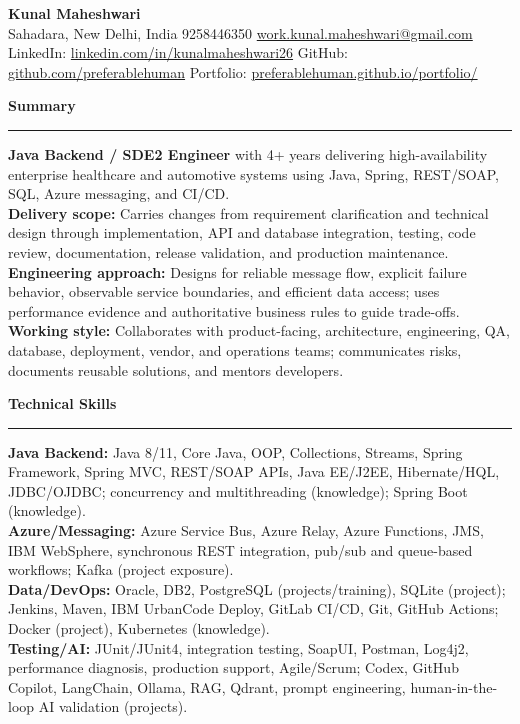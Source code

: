 \documentclass[11pt,letterpaper]{article}
\newcommand{\ressection}[1]{\Needspace{6\baselineskip}\vspace{8pt}\par\textbf{#1}\par\vspace{2pt}\hrule\vspace{5pt}}
\begin{document}
\pagestyle{empty}\raggedright\fontsize{11}{12.5}\selectfont

{\Large \textbf{Kunal Maheshwari}}\\
Sahadara, New Delhi, India \textbar{} 9258446350 \textbar{} \href{mailto:work.kunal.maheshwari@gmail.com}{work.kunal.maheshwari@gmail.com}\\
LinkedIn: \href{https://www.linkedin.com/in/kunalmaheshwari26}{linkedin.com/in/kunalmaheshwari26} \textbar{} GitHub: \href{https://github.com/preferablehuman}{github.com/preferablehuman} \textbar{} Portfolio: \href{https://preferablehuman.github.io/portfolio/}{preferablehuman.github.io/portfolio/}

\ressection{Summary}
\textbf{Java Backend / SDE2 Engineer} with 4+ years delivering high-availability enterprise healthcare and automotive systems using Java, Spring, REST/SOAP, SQL, Azure messaging, and CI/CD.\\[2pt]
\textbf{Delivery scope:} Carries changes from requirement clarification and technical design through implementation, API and database integration, testing, code review, documentation, release validation, and production maintenance.\\[2pt]
\textbf{Engineering approach:} Designs for reliable message flow, explicit failure behavior, observable service boundaries, and efficient data access; uses performance evidence and authoritative business rules to guide trade-offs.\\[2pt]
\textbf{Working style:} Collaborates with product-facing, architecture, engineering, QA, database, deployment, vendor, and operations teams; communicates risks, documents reusable solutions, and mentors developers.

\ressection{Technical Skills}
\textbf{Java Backend:} Java 8/11, Core Java, OOP, Collections, Streams, Spring Framework, Spring MVC, REST/SOAP APIs, Java EE/J2EE, Hibernate/HQL, JDBC/OJDBC; concurrency and multithreading (knowledge); Spring Boot (knowledge).\\
\textbf{Azure/Messaging:} Azure Service Bus, Azure Relay, Azure Functions, JMS, IBM WebSphere, synchronous REST integration, pub/sub and queue-based workflows; Kafka (project exposure).\\
\textbf{Data/DevOps:} Oracle, DB2, PostgreSQL (projects/training), SQLite (project); Jenkins, Maven, IBM UrbanCode Deploy, GitLab CI/CD, Git, GitHub Actions; Docker (project), Kubernetes (knowledge).\\
\textbf{Testing/AI:} JUnit/JUnit4, integration testing, SoapUI, Postman, Log4j2, performance diagnosis, production support, Agile/Scrum; Codex, GitHub Copilot, LangChain, Ollama, RAG, Qdrant, prompt engineering, human-in-the-loop AI validation (projects).
\end{document}
